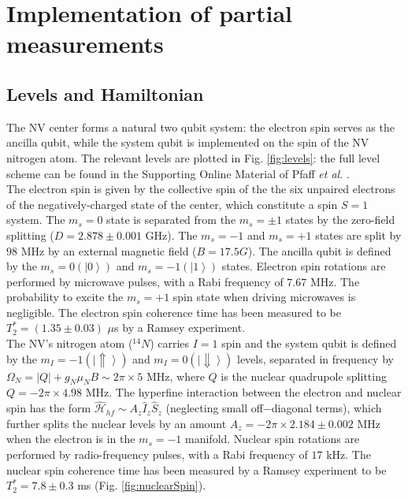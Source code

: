 \graphicspath{{./ch_adptv_msmnt_cntrl_SI/figures/}}


\chapter[Implementation of partial measurements]{Implementation of partial measurements}
\label{ch:AMCappendix}

\def\bra#1{\left<#1\right|}
\def\ket#1{\left|#1\right>}
\def\dm#1{\left|#1\right> \left<#1\right|}


\section{Levels and Hamiltonian}
The NV center forms a natural two qubit system: the electron spin serves as the ancilla qubit, while the system qubit is implemented on the spin of the NV nitrogen atom. The relevant levels are plotted in Fig. \ref{fig:levels}: the full level scheme can be found in the Supporting Online Material of Pfaff \textit{et al}. \cite{Pfaff_NatPhys_2012}.\\
The electron spin is given by the collective spin of the the six unpaired electrons of the negatively-charged state of the center, which constitute a spin $S=1$ system. The $m_s=0$ state is separated from the $m_s=\pm1$ states by the zero-field splitting ($D = 2.878 \pm 0.001$ GHz). The $m_s=-1$ and $m_s=+1$ states are split by $ 98$ MHz by an external magnetic field ($B = 17.5 G$). The ancilla qubit is defined by the $m_s=0  (\ket{0})$ and $m_s=-1  (\ket{1})$ states. Electron spin rotations are performed by microwave pulses, with a Rabi frequency of $ 7.67$ MHz. The probability to excite the $m_s=+1$ spin state when driving microwaves is negligible. The electron spin coherence time has been measured to be $T_2^* = (1.35 \pm 0.03)$ $\mu$s by a Ramsey experiment.\\
The NV's nitrogen atom ($^{14}N$) carries $I=1$ spin and the system qubit is defined by the $m_I = -1 (\ket{\Uparrow})$ and $m_I=0 (\ket{\Downarrow})$ levels, separated in frequency by $\Omega_N = |Q| + g_N \mu_N B \sim 2 \pi \times 5$ MHz, where $Q$ is the nuclear quadrupole splitting $Q = -2\pi \times 4.98 $ MHz. The hyperfine interaction between the electron and nuclear spin has the form $\mathcal{\hat{H}}_{hf} \sim A_z \hat{I}_z \hat{S}_z$ (neglecting small off$-$diagonal terms), which further splits the nuclear levels by an amount $A_z = -2\pi \times 2.184 \pm 0.002$ MHz when the electron is in the $m_s=-1$ manifold.
Nuclear spin rotations are performed by radio-frequency pulses, with a Rabi frequency of $17$ kHz. The nuclear spin coherence time has been measured by a Ramsey experiment to be $T_2^* = 7.8 \pm 0.3$ ms (Fig. \ref{fig:nuclearSpin}).\\

